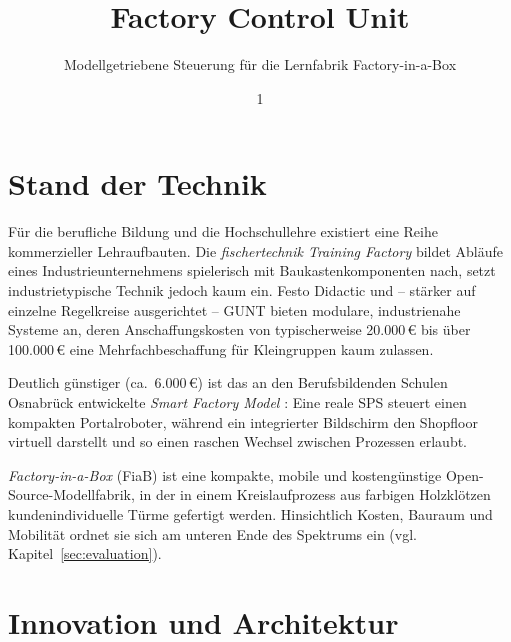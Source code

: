 \documentclass[]{article}%
\title{Factory Control Unit}
\subtitle{Modellgetriebene Steuerung für die Lernfabrik Factory-in-a-Box}
\author{1}{Klaus M. Liebler}
\affil{1}{Hochschule Osnabrück, Fakultät für Ingenieurwissenschaften und Informatik, Osnabrück, Deutschland}
\begin{document}
\setcounter{page}{1}
\maketitle





\section{Stand der Technik}

Für die berufliche Bildung und die Hochschullehre existiert eine Reihe kommerzieller Lehraufbauten. Die \emph{fischertechnik Training Factory} \cite{fischertechnik} bildet Abläufe eines Industrieunternehmens spielerisch mit Baukastenkomponenten nach, setzt industrietypische Technik jedoch kaum ein. Festo Didactic und -- stärker auf einzelne Regelkreise ausgerichtet -- GUNT bieten modulare, industrienahe Systeme an, deren Anschaffungskosten von typischerweise 20.000\,€ bis über 100.000\,€ eine Mehrfachbeschaffung für Kleingruppen kaum zulassen.

Deutlich günstiger (ca.~6.000\,€) ist das an den Berufsbildenden Schulen Osnabrück entwickelte \emph{Smart Factory Model} \cite{strating2023}: Eine reale SPS steuert einen kompakten Portalroboter, während ein integrierter Bildschirm den Shopfloor virtuell darstellt und so einen raschen Wechsel zwischen Prozessen erlaubt.

\emph{Factory-in-a-Box} (FiaB) \cite{liebler2025} ist eine kompakte, mobile und kostengünstige Open-Source-Modellfabrik, in der in einem Kreislaufprozess aus farbigen Holzklötzen kundenindividuelle Türme gefertigt werden. Hinsichtlich Kosten, Bauraum und Mobilität ordnet sie sich am unteren Ende des Spektrums ein (vgl. Kapitel~\ref{sec:evaluation}).

\section{Innovation und Architektur}
\end{document}
